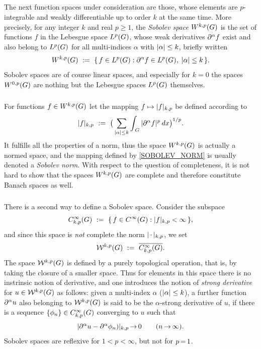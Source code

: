 \documentclass[11pt,twoside]{article}
\begin{document}
\begin{itemize}[leftmargin=15pt,itemsep=6pt]
\subparagraph*{}
The next function spaces under consideration are those,
whose elements are $p$-integrable and weakly differentiable up to order $k$
at the same time.
More precisely,
for any integer $k$ and real $p \geq 1$,
the \textit{Sobolev space} $W^{k,p}(G)$ is the set
of functions $f$ in the Lebesgue space $L^p(G)$,
whose weak derivatives $\partial^{\alpha} f$ exist and also belong to $L^p(G)$
for all multi-indices $\alpha$ with $ \abs{\alpha} \leq k$,
briefly written
\[
\SobW
\, \eqdef \,
\{\,f \in \Lp: \PA f \in \Lp, \; \abs{\alpha} \leq k \, \}.
\]
Sobolev spaces are of course linear spaces,
and especially for $k=0$
the spaces $W^{0,p}(G)$ are nothing but the Lebesgue spaces $L^p(G)$ themselves.

\subparagraph*{} %
For functions $f \in W^{k,p}(G)$ let the mapping $f \mapsto \abs{f} _{k,p}$
be defined according to
\begin{equation}\label{SOBOLEV_NORM}
\abs{f} _{k,p} \, \eqdef \,
\big(
\sum_{\abs{\alpha } \leq k}
\int_{\,\G} \, \abs{\PA f} ^p \, dx
\big) ^{1/p}.
\end{equation}
It fulfills all the properties of a norm,
thus the space $W^{k,p}(G)$ is actually a normed space,
and the mapping defined by \eqref{SOBOLEV_NORM}
is usually denoted a \textit{Sobolev norm}.
With respect to the question of completeness,
it is not hard to show that
the spaces $W^{k,p}(G)$ are complete
and therefore constitute Banach spaces as well.

\subparagraph*{} %
There is a second way to define a Sobolev space.
Consider the subspace
\[
C_{k,p}^{\infty}(\G) \, \eqdef \, \{\, f \in \SF: \abs{f} _{k,p} < \infty \,\},
\]
and since this space is \textit{not} complete
{\wrt} the norm $\abs{\,\cdot\,} _{k,p}$,
we set
\[
{\mathcal{W}}^{k,p}(G) \, \,:=\, \, \overline{C_{k,p}^{\infty}(G)}.
\]
The space ${\mathcal{W}}^{k,p}(G)$ is defined by a purely topological operation,
that is,
by taking the closure of a smaller space.
Thus for elements in this space there is no instrinsic notion of derivative,
and one introduces the notion of \textit{strong derivative} for
$u \in {\mathcal{W}}^{k,p}(G)$ as follows: 
given a multi-index $\alpha$ ($\abs{\alpha} \leq k$),
a further function $\partial^{\alpha} u$ also belonging to ${\mathcal{W}}^{k,p}(G)$
is said to be the $\alpha$-strong derivative of $u$,
if there is a sequence $\{\phi_n\} \in C_{k,p}^{\infty}(G)$
converging to $u$ such that
\[
\abs{\PA u - \PA \phi_n)} _{k,p} \xto 0 \quad \quad (n \xto \infty).
\]
Sobolev spaces are reflexive for $1 < p < \infty$,
but not for $p {\,=\,} 1$.


\end{itemize}
\end{document}
